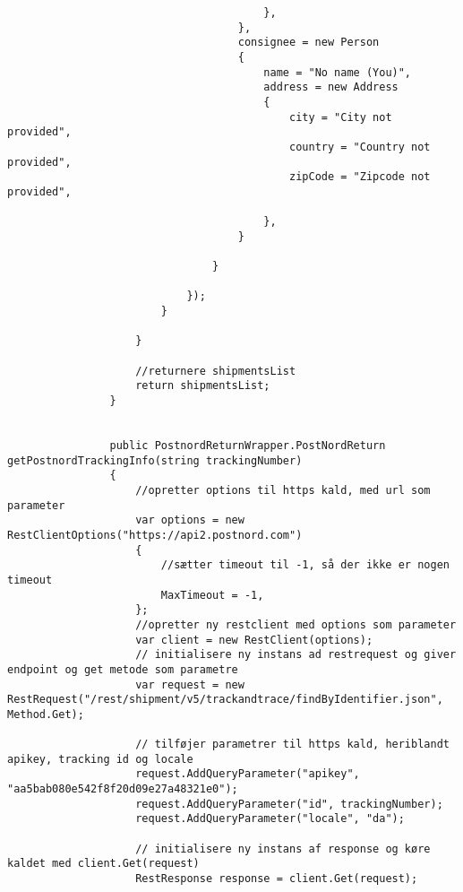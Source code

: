 \begin{verbatim}
                                        },
                                    },
                                    consignee = new Person
                                    {
                                        name = "No name (You)",
                                        address = new Address
                                        {
                                            city = "City not provided",
                                            country = "Country not provided",
                                            zipCode = "Zipcode not provided",
        
                                        },
                                    }
        
                                }
        
                            });
                        } 
        
                    }
        
                    //returnere shipmentsList
                    return shipmentsList;
                }
        
        
                public PostnordReturnWrapper.PostNordReturn getPostnordTrackingInfo(string trackingNumber)
                {
                    //opretter options til https kald, med url som parameter
                    var options = new RestClientOptions("https://api2.postnord.com")
                    {
                        //sætter timeout til -1, så der ikke er nogen timeout
                        MaxTimeout = -1,
                    };
                    //opretter ny restclient med options som parameter
                    var client = new RestClient(options);
                    // initialisere ny instans ad restrequest og giver endpoint og get metode som parametre
                    var request = new RestRequest("/rest/shipment/v5/trackandtrace/findByIdentifier.json", Method.Get);
        
                    // tilføjer parametrer til https kald, heriblandt apikey, tracking id og locale
                    request.AddQueryParameter("apikey", "aa5bab080e542f8f20d09e27a48321e0");
                    request.AddQueryParameter("id", trackingNumber);
                    request.AddQueryParameter("locale", "da");
        
                    // initialisere ny instans af response og køre kaldet med client.Get(request)
                    RestResponse response = client.Get(request);
        

\end{verbatim}
